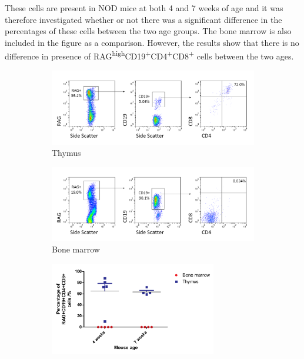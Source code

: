 These cells are present in NOD mice at both 4 and 7 weeks of age and it was therefore investigated whether or not there was a significant difference in the percentages of these cells between the two age groups. 
The bone marrow is also included in the figure as a comparison.
However, the results show that there is no difference in presence of RAG\textsuperscript{high}CD19\textsuperscript{+}CD4\textsuperscript{+}CD8\textsuperscript{+} cells between the two ages.


\begin{figure}	
	\begin{subfigure}{\textwidth}
	\includegraphics[width=\textwidth]{Figures/Thymus1RAGCD19DP.png}
	\caption{Thymus}
	\label{subfig:ThyRAGCD19DP}
	\end{subfigure}
	\begin{subfigure}{\textwidth}
	\includegraphics[width=\textwidth]{Figures/BM1RAGCD19DP.png}
	\caption{Bone marrow}
	\label{subfig:BMRAGCD19DP}
	\end{subfigure}
	\begin{subfigure}{\textwidth}
	\centering
	\includegraphics[width=0.8\textwidth]{Figures/BMvThyDP.pdf}

\end{subfigure}
\end{figure}
